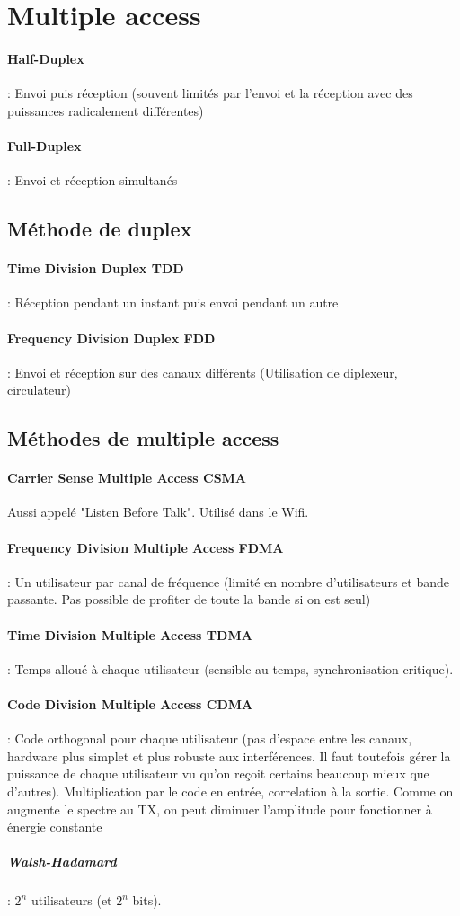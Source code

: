 \documentclass[resume]{subfiles}
\begin{document}
\section{Multiple access}
\paragraph{Half-Duplex} : Envoi puis réception (souvent limités par l'envoi et la réception avec des puissances radicalement différentes)
\paragraph{Full-Duplex} : Envoi et réception simultanés
\subsection{Méthode de duplex}
\paragraph{Time Division Duplex TDD} : Réception pendant un instant puis envoi pendant un autre
\paragraph{Frequency Division Duplex FDD} : Envoi et réception sur des canaux différents (Utilisation de diplexeur, circulateur)
\subsection{Méthodes de multiple access}
\paragraph{Carrier Sense Multiple Access CSMA} Aussi appelé "Listen Before Talk". Utilisé dans le Wifi.
\paragraph{Frequency Division Multiple Access FDMA} : Un utilisateur par canal de fréquence (limité en nombre d'utilisateurs et bande passante. Pas possible de profiter de toute la bande si on est seul)
\paragraph{Time Division Multiple Access TDMA} : Temps alloué à chaque utilisateur (sensible au temps, synchronisation critique).
\paragraph{Code Division Multiple Access CDMA} : Code orthogonal pour chaque utilisateur (pas d'espace entre les canaux, hardware plus simplet et plus robuste aux interférences. Il faut toutefois gérer la puissance de chaque utilisateur vu qu'on reçoit certains beaucoup mieux que d'autres). Multiplication par le code en entrée, correlation à la sortie. Comme on augmente le spectre au TX, on peut diminuer l'amplitude pour fonctionner à énergie constante
\subparagraph{Walsh-Hadamard} : $2^n$ utilisateurs (et $2^n$ bits).
\end{document}
